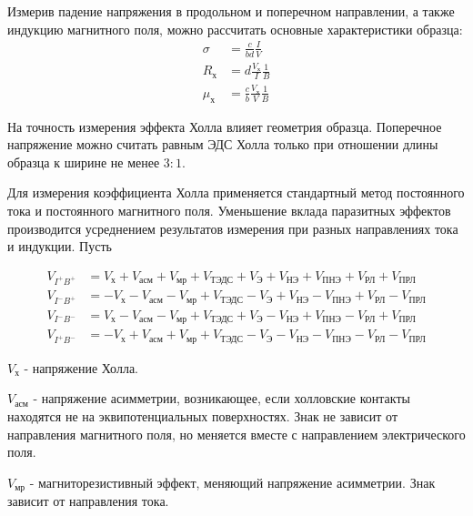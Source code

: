 Измерив падение напряжения в продольном и поперечном направлении, а также индукцию магнитного поля, можно рассчитать основные характеристики образца:
\begin{equation}
\begin{split}
\sigma &= \frac{c}{b d} \frac{I}{V} \\
R_{\text{х}} &= d \frac{V_{\text{х}}}{I} \frac{1}{B} \\
\mu_{\text{х}} &= \frac{c}{b} \frac{V_{\text{х}}}{V} \frac{1}{B}
\end{split}
\label{eq3_mu}
\end{equation}

На точность измерения эффекта Холла влияет геометрия образца. Поперечное напряжение можно считать равным ЭДС Холла только при отношении длины образца к ширине не менее $3:1$.

Для измерения коэффициента Холла применяется стандартный метод постоянного тока и постоянного магнитного поля. Уменьшение вклада паразитных эффектов производится усреднением результатов измерения при разных направлениях тока и индукции. Пусть

\begin{equation}
\begin{split}
V_{I^{+}B^{+}} &= V_{\text{х}} + V_{\text{асм}} + V_{\text{мр}} + V_{\text{ТЭДС}} + V_{\text{Э}} + V_{\text{НЭ}} + V_{\text{ПНЭ}} + V_{\text{РЛ}} + V_{\text{ПРЛ}} \\
V_{I^{-}B^{+}} &= -V_{\text{х}} - V_{\text{асм}} - V_{\text{мр}} + V_{\text{ТЭДС}} - V_{\text{Э}} + V_{\text{НЭ}} - V_{\text{ПНЭ}} + V_{\text{РЛ}} - V_{\text{ПРЛ}} \\
V_{I^{-}B^{-}} &= V_{\text{х}} - V_{\text{асм}} - V_{\text{мр}} + V_{\text{ТЭДС}} + V_{\text{Э}} - V_{\text{НЭ}} + V_{\text{ПНЭ}} - V_{\text{РЛ}} + V_{\text{ПРЛ}} \\
V_{I^{+}B^{-}} &= -V_{\text{х}} + V_{\text{асм}} + V_{\text{мр}} + V_{\text{ТЭДС}} - V_{\text{Э}} - V_{\text{НЭ}} - V_{\text{ПНЭ}} - V_{\text{РЛ}} - V_{\text{ПРЛ}}
\end{split}
\end{equation}

$V_{\text{х}}$ - напряжение Холла.

$V_{\text{асм}}$ - напряжение асимметрии, возникающее, если холловские контакты находятся не на эквипотенциальных поверхностях. Знак не зависит от направления магнитного поля, но меняется вместе с направлением электрического поля.

$V_{\text{мр}}$ - магниторезистивный эффект, меняющий напряжение асимметрии. Знак зависит от направления тока.

